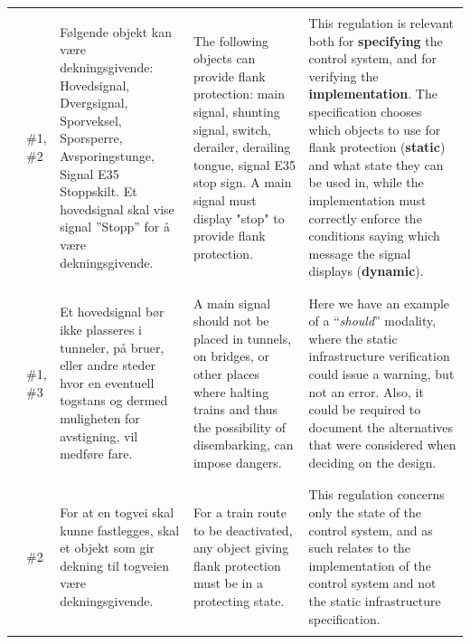 \begin{longtable}[h]{L{0.5cm} L{0.8cm} L{4.0cm} L{4.0cm} L{5.0cm}}
\vspace{0.5em} \\* 
&\#1, \#2 &
Følgende objekt kan være dekningsgivende: Hovedsignal, Dvergsignal, Sporveksel, Sporsperre, Avsporingstunge, Signal E35 Stoppskilt.
Et hovedsignal skal vise signal ”Stopp” for å være dekningsgivende.
&
The following objects can provide flank protection: main signal, shunting signal, switch, derailer, derailing tongue, signal E35 stop sign.
A main signal must display "stop" to provide flank protection.
&
This regulation is relevant both for \textbf{specifying} the control system, and for verifying the \textbf{implementation}. The specification chooses which objects to use for flank protection (\textbf{static}) and what state they can be used in, while the implementation must correctly enforce the conditions saying which message the signal displays (\textbf{dynamic}).
\\
& & & & \\
\vspace{0.5em} \\* 
&\#1, \#3 &
Et hovedsignal bør ikke plasseres i tunneler, på bruer, eller andre steder hvor en eventuell togstans og dermed muligheten for avstigning, vil medføre fare. 
&
A main signal should not be placed in tunnels, on bridges, or other places where halting trains and thus the possibility of disembarking, can impose dangers.
& 
Here we have an example of a ``\emph{should}'' modality, where the 
static infrastructure verification could issue a warning, but not an error. 
Also, it could be required to document the alternatives that were considered
when deciding on the design.
\\
& & & & \\
\vspace{0.5em} \\* 
&\#2 &
For at en togvei skal kunne fastlegges, skal et objekt som gir dekning til togveien være dekningsgivende. 
&
For a train route to be deactivated, any object giving flank protection must be in a protecting state.
& 
This regulation concerns only the state of the control system, and as such 
relates to the implementation of the control system and not the static infrastructure specification.
\\
& & & & \\ 

\end{longtable}
